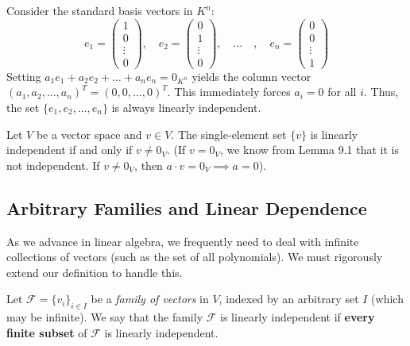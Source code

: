 \begin{example}
Consider the standard basis vectors in $K^n$:
\[
e_1 = \begin{pmatrix} 1 \\ 0 \\ \vdots \\ 0 \end{pmatrix}, \quad e_2 = \begin{pmatrix} 0 \\ 1 \\ \vdots \\ 0 \end{pmatrix}, \quad \dots \quad, \quad e_n = \begin{pmatrix} 0 \\ 0 \\ \vdots \\ 1 \end{pmatrix}
\]
Setting $a_1 e_1 + a_2 e_2 + \dots + a_n e_n = 0_{K^n}$ yields the column vector $(a_1, a_2, \dots, a_n)^T = (0, 0, \dots, 0)^T$. This immediately forces $a_i = 0$ for all $i$. Thus, the set $\{e_1, e_2, \dots, e_n\}$ is always linearly independent.
\end{example}

\begin{example}
Let $V$ be a vector space and $v \in V$. The single-element set $\{v\}$ is linearly independent if and only if $v \ne 0_V$. (If $v = 0_V$, we know from Lemma 9.1 that it is not independent. If $v \ne 0_V$, then $a \cdot v = 0_V \implies a = 0$).
\end{example}

\subsection{Arbitrary Families and Linear Dependence}

As we advance in linear algebra, we frequently need to deal with infinite collections of vectors (such as the set of all polynomials). We must rigorously extend our definition to handle this.

\begin{definition}
Let $\mathcal{F} = \{v_i\}_{i \in I}$ be a \textit{family of vectors} in $V$, indexed by an arbitrary set $I$ (which may be infinite). We say that the family $\mathcal{F}$ is linearly independent if \textbf{every finite subset} of $\mathcal{F}$ is linearly independent.
\end{definition}

